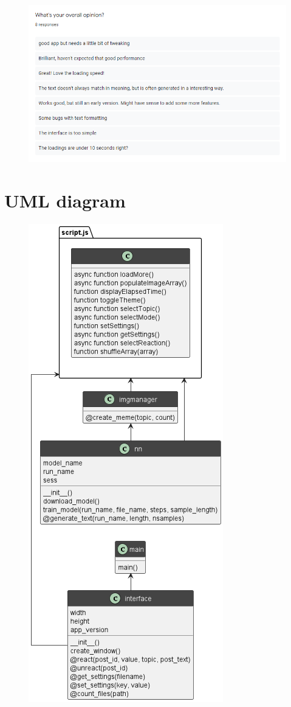 \documentclass[12pt]{report}
\begin{document}
\begin{appendices}
\begin{figure}[ht]
  \label{fig:feedback3}
\end{figure}
\begin{figure}[ht]
  \centering
  \includegraphics[width=.8\linewidth]{img/feedback4.png}
  \label{fig:feedback4}
\end{figure}

\clearpage

\section*{UML diagram}
\label{appendix:uml}

\begin{figure}[ht]
  \centering
  \includegraphics[width=.4\linewidth]{img/uml.png}
  \label{fig:uml}
\end{figure}


\end{appendices}
\end{document}
